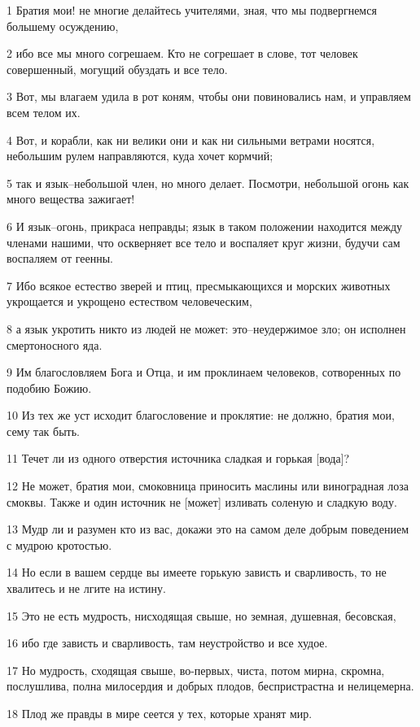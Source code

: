 \par 1 Братия мои! не многие делайтесь учителями, зная, что мы подвергнемся большему осуждению,
\par 2 ибо все мы много согрешаем. Кто не согрешает в слове, тот человек совершенный, могущий обуздать и все тело.
\par 3 Вот, мы влагаем удила в рот коням, чтобы они повиновались нам, и управляем всем телом их.
\par 4 Вот, и корабли, как ни велики они и как ни сильными ветрами носятся, небольшим рулем направляются, куда хочет кормчий;
\par 5 так и язык--небольшой член, но много делает. Посмотри, небольшой огонь как много вещества зажигает!
\par 6 И язык--огонь, прикраса неправды; язык в таком положении находится между членами нашими, что оскверняет все тело и воспаляет круг жизни, будучи сам воспаляем от геенны.
\par 7 Ибо всякое естество зверей и птиц, пресмыкающихся и морских животных укрощается и укрощено естеством человеческим,
\par 8 а язык укротить никто из людей не может: это--неудержимое зло; он исполнен смертоносного яда.
\par 9 Им благословляем Бога и Отца, и им проклинаем человеков, сотворенных по подобию Божию.
\par 10 Из тех же уст исходит благословение и проклятие: не должно, братия мои, сему так быть.
\par 11 Течет ли из одного отверстия источника сладкая и горькая [вода]?
\par 12 Не может, братия мои, смоковница приносить маслины или виноградная лоза смоквы. Также и один источник не [может] изливать соленую и сладкую воду.
\par 13 Мудр ли и разумен кто из вас, докажи это на самом деле добрым поведением с мудрою кротостью.
\par 14 Но если в вашем сердце вы имеете горькую зависть и сварливость, то не хвалитесь и не лгите на истину.
\par 15 Это не есть мудрость, нисходящая свыше, но земная, душевная, бесовская,
\par 16 ибо где зависть и сварливость, там неустройство и все худое.
\par 17 Но мудрость, сходящая свыше, во-первых, чиста, потом мирна, скромна, послушлива, полна милосердия и добрых плодов, беспристрастна и нелицемерна.
\par 18 Плод же правды в мире сеется у тех, которые хранят мир.

